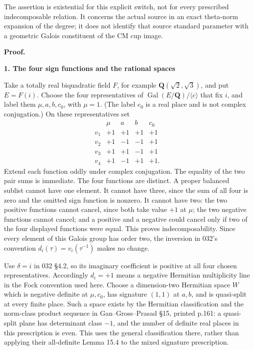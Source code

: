 The assertion is existential for this explicit switch, not for every prescribed indecomposable relation. It concerns the actual source in an exact theta-norm expansion of the degree; it does not identify that source standard parameter with a geometric Galois constituent of the CM cup image.

\textbf{Proof.}

\textbf{1. The four sign functions and the rational spaces}

Take a totally real biquadratic field \(F\), for example \(\mathbf Q(\sqrt2,\sqrt3)\), and put \(E=F(i)\). Choose the four representatives of \(\operatorname{Gal}(E/\mathbf Q)/\langle c\rangle\) that fix \(i\), and label them \(\mu,a,b,c_0\), with \(\mu=1\). (The label \(c_0\) is a real place and is not complex conjugation.) On these representatives set \[
\begin{array}{c|rrrr}
 &\mu&a&b&c_0\\\hline
v_1&+1&+1&+1&+1\\
v_2&+1&-1&-1&+1\\
v_3&+1&+1&-1&+1\\
v_4&+1&-1&+1&+1.
\end{array}
\tag{T16.2}
\] Extend each function oddly under complex conjugation. The equality of the two pair sums is immediate. The four functions are distinct. A proper balanced sublist cannot have one element. It cannot have three, since the sum of all four is zero and the omitted sign function is nonzero. It cannot have two: the two positive functions cannot cancel, since both take value \(+1\) at \(\mu\); the two negative functions cannot cancel; and a positive and a negative could cancel only if two of the four displayed functions were equal. This proves indecomposability. Since every element of this Galois group has order two, the inversion in 032's convention \(d_i(\tau)=v_i(\tau^{-1})\) makes no change.

Use \(\delta=i\) in 032 §4.2, so its imaginary coefficient is positive at all four chosen representatives. Accordingly \(d_i=+1\) means a negative Hermitian multiplicity line in the Fock convention used here. Choose a dimension-two Hermitian space \(W\) which is negative definite at \(\mu,c_0\), has signature \((1,1)\) at \(a,b\), and is quasi-split at every finite place. Such a space exists by the Hermitian classification and the norm-class product sequence in Gan--Gross--Prasad §15, printed p.161: a quasi-split plane has determinant class \(-1\), and the number of definite real places in this prescription is even. This uses the general classification there, rather than applying their all-definite Lemma 15.4 to the mixed signature prescription.

